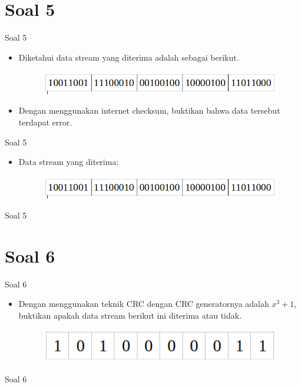 \documentclass[aspectratio=169]{beamer}
\begin{document}
\section{Soal 5}

\begin{frame}[t]{Soal 5}
	\begin{itemize}
		\item Diketahui data stream yang diterima adalah sebagai berikut.
		
		\begin{figure}
			\centering
			\includegraphics[width=0.9\linewidth]{../../../soal/kuis/soal5_kuis2}
		\end{figure}
		
		\item Dengan menggunakan internet checksum, buktikan bahwa data tersebut terdapat error.
	\end{itemize}
\end{frame}

\begin{frame}[t]{Soal 5}
	\begin{itemize}
		\item Data stream yang diterima:
		\begin{figure}
			\centering
			\includegraphics[width=0.9\linewidth]{../../../soal/kuis/soal5_kuis2}
		\end{figure}
	\end{itemize}
\end{frame}

\begin{frame}[t]{Soal 5}
	
\end{frame}


\section{Soal 6}

\begin{frame}[t]{Soal 6}
	\begin{itemize}
		\item Dengan menggunakan teknik CRC dengan CRC generatornya adalah $ x^3 + 1 $, buktikan apakah data stream berikut ini diterima atau tidak.
		
		\begin{figure}
			\centering
			\includegraphics[width=0.4\linewidth]{../../../soal/kuis/soal6_kuis2}
		\end{figure}

	\end{itemize}
\end{frame}

\begin{frame}[t]{Soal 6}

\end{frame}
\end{document}

